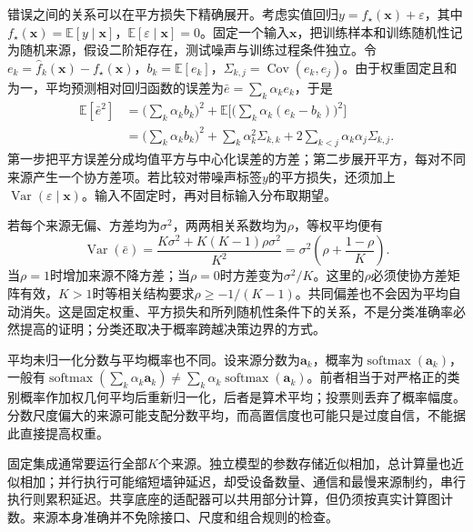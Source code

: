 错误之间的关系可以在平方损失下精确展开。考虑实值回归$y=f_\star(\bm{x})+\varepsilon$，其中$f_\star(\bm{x})=\mathbb{E}[y\mid\bm{x}]$，$\mathbb{E}[\varepsilon\mid\bm{x}]=0$。固定一个输入$\bm{x}$，把训练样本和训练随机性记为随机来源，假设二阶矩存在，测试噪声与训练过程条件独立。令$e_k=\hat f_k(\bm{x})-f_\star(\bm{x})$，$b_k=\mathbb{E}[e_k]$，$\Sigma_{k,j}=\operatorname{Cov}(e_k,e_j)$。由于权重固定且和为一，平均预测相对回归函数的误差为$\bar e=\sum_k\alpha_ke_k$，于是
\begin{equation}
  \begin{aligned}
    \mathbb{E}[\bar e^2]
    &=\biggl(\sum_k\alpha_k b_k\biggr)^2+
      \mathbb{E}\biggl[\biggl(\sum_k\alpha_k(e_k-b_k)\biggr)^2\biggr]\\
    &=\biggl(\sum_k\alpha_k b_k\biggr)^2+
      \sum_k\alpha_k^2\Sigma_{k,k}
      +2\sum_{k<j}\alpha_k\alpha_j\Sigma_{k,j}.
  \end{aligned}
  \label{eq:ket-integration-bias-covariance}
\end{equation}
第一步把平方误差分成均值平方与中心化误差的方差；第二步展开平方，每对不同来源产生一个协方差项。若比较对带噪声标签$y$的平方损失，还须加上$\operatorname{Var}(\varepsilon\mid\bm{x})$。输入不固定时，再对目标输入分布取期望。

若每个来源无偏、方差均为$\sigma^2$，两两相关系数均为$\rho$，等权平均便有
\begin{equation}
  \operatorname{Var}(\bar e)
  =\frac{K\sigma^2+K(K-1)\rho\sigma^2}{K^2}
  =\sigma^2\left(\rho+\frac{1-\rho}{K}\right).
  \label{eq:ket-integration-equal-correlation}
\end{equation}
当$\rho=1$时增加来源不降方差；当$\rho=0$时方差变为$\sigma^2/K$。这里的$\rho$必须使协方差矩阵有效，$K>1$时等相关结构要求$\rho\geq-1/(K-1)$。共同偏差也不会因为平均自动消失。这是固定权重、平方损失和所列随机性条件下的关系，不是分类准确率必然提高的证明；分类还取决于概率跨越决策边界的方式。

平均未归一化分数与平均概率也不同。设来源分数为$\bm{a}_k$，概率为$\operatorname{softmax}(\bm{a}_k)$，一般有$\operatorname{softmax}(\sum_k\alpha_k\bm{a}_k)\neq\sum_k\alpha_k\operatorname{softmax}(\bm{a}_k)$。前者相当于对严格正的类别概率作加权几何平均后重新归一化，后者是算术平均；投票则丢弃了概率幅度。分数尺度偏大的来源可能支配分数平均，而高置信度也可能只是过度自信，不能据此直接提高权重。

固定集成通常要运行全部$K$个来源。独立模型的参数存储近似相加，总计算量也近似相加；并行执行可能缩短墙钟延迟，却受设备数量、通信和最慢来源制约，串行执行则累积延迟。共享底座的适配器可以共用部分计算，但仍须按真实计算图计数。来源本身准确并不免除接口、尺度和组合规则的检查。

